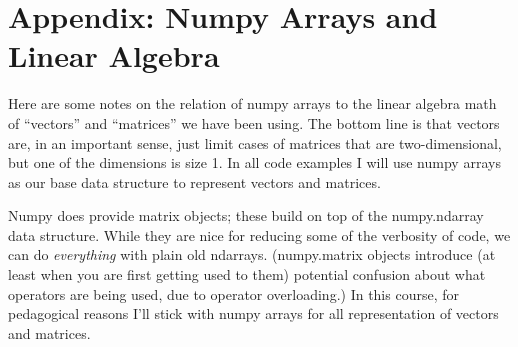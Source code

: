 \documentclass[10pt]{article}
\begin{document}
\newpage

\section*{Appendix: Numpy Arrays and Linear Algebra}

Here are some notes on the relation of numpy arrays to the linear algebra math of ``vectors'' and ``matrices'' we have been using.  The bottom line is that vectors are, in an important sense, just limit cases of matrices that are two-dimensional, but one of the dimensions is size 1.  In all code examples I will use numpy arrays as our base data structure to represent vectors and matrices.

Numpy does provide matrix objects; these build on top of the numpy.ndarray data structure.  While they are nice for reducing some of the verbosity of code, we can do {\em everything} with plain old ndarrays.  (numpy.matrix objects introduce (at least when you are first getting used to them) potential confusion about what operators are being used, due to operator overloading.)  In this course, for pedagogical reasons I'll stick with numpy arrays for all representation of vectors and matrices.
\end{document}
